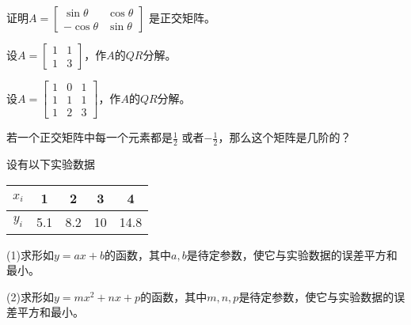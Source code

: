 \begin{ex}\label{6.27}
证明$A=\begin{bmatrix}\sin\theta&\cos\theta\\-\cos\theta&\sin\theta\end{bmatrix}$ 是正交矩阵。
\end{ex}

\begin{ex}\label{6.28}
设$A=\begin{bmatrix}1&1\\1&3\end{bmatrix}$，作$A$的$QR$分解。
\end{ex}

\begin{ex}\label{6.29}
设$A=\begin{bmatrix}1&0&1\\1&1&1\\1&2&3\end{bmatrix}$，作$A$的$QR$分解。
\end{ex}

\begin{ex}\label{6.30}
若一个正交矩阵中每一个元素都是$\frac{1}{2}$ 或者$-\frac{1}{2}$，那么这个矩阵是几阶的？
\end{ex}

\begin{ex}\label{6.31}
设有以下实验数据
\begin{table}[H]
\centering
\begin{tabular}{ccccc}
  \hline
   $x_i$ & 1 & 2 & 3& 4 \\
   \hline
   $y_i$ & 5.1 & 8.2 & 10& 14.8 \\
  \hline
\end{tabular}
\end{table}

(1)求形如$y=ax+b$的函数，其中$a,b$是待定参数，使它与实验数据的误差平方和最小。

(2)求形如$y=mx^2+nx+p$的函数，其中$m,n,p$是待定参数，使它与实验数据的误差平方和最小。
\end{ex}


